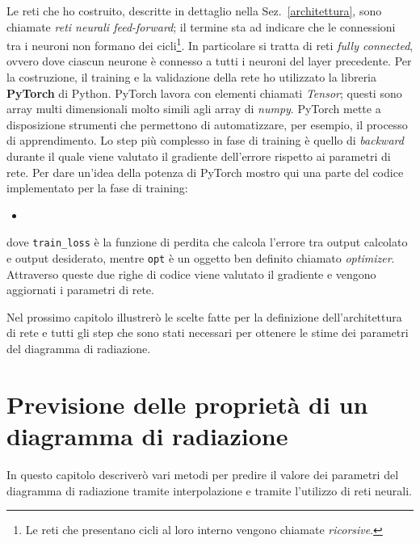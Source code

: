 \documentclass[12pt,a4paper,final]{book}
\newcommand{\insertcode}[2]{\begin{itemize}\item[]\end{itemize}} %
\begin{document}
Le reti che ho costruito, descritte in dettaglio nella Sez.~\ref{architettura}, sono chiamate \textit{reti neurali feed-forward}; il termine sta ad indicare che le connessioni tra i neuroni non formano dei cicli\footnote{Le reti che presentano cicli al loro interno vengono chiamate \textit{ricorsive}.}. In particolare si tratta di reti \textit{fully connected}, ovvero dove ciascun neurone è connesso a tutti i neuroni del layer precedente.
Per la costruzione, il training e la validazione della rete ho utilizzato la libreria \textbf{PyTorch} di Python. 
PyTorch lavora con elementi chiamati \textit{Tensor}; questi sono array multi dimensionali molto simili agli array di \textit{numpy}. PyTorch mette a disposizione strumenti che permettono di automatizzare, per esempio, il processo di apprendimento. Lo step più complesso in fase di training è quello di \textit{backward} durante il quale viene valutato il gradiente dell'errore rispetto ai parametri di rete. Per dare un'idea della potenza di PyTorch mostro qui una parte del codice implementato per la fase di training:
\insertcode{../scripts/opt.py}{}\label{opt}
dove \texttt{train\_loss} \`e la funzione di perdita che calcola l'errore tra output calcolato e output desiderato, mentre \texttt{opt} \`e un oggetto ben definito chiamato \textit{optimizer}.
Attraverso queste due righe di codice viene valutato il gradiente e vengono aggiornati i parametri di rete.


Nel prossimo capitolo illustrerò le scelte fatte per la definizione dell'architettura di rete e tutti gli step che sono stati necessari per ottenere le stime dei parametri del diagramma di radiazione.




\chapter{Previsione delle proprietà di un diagramma di radiazione}\label{prev_param}
In questo capitolo descriverò vari metodi per predire il valore dei parametri del diagramma di radiazione tramite interpolazione e tramite l'utilizzo di reti neurali. 
\end{document}
